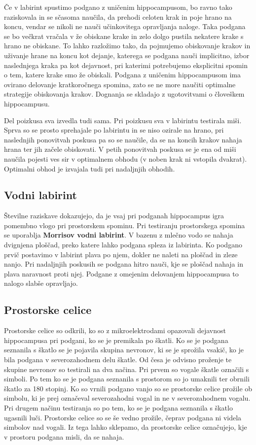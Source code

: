 \documentclass[10pt,a4paper]{article}
\begin{document}
Če v labirint spustimo podgano z uničenim hippocampusom, bo ravno tako raziskovala in se sčasoma naučila, da prehodi celoten krak in poje hrano na koncu, vendar se nikoli ne nauči učinkovitega opravljanja naloge. Taka podgana se bo večkrat vračala v že obiskane krake in zelo dolgo pustila nekatere krake s hrano ne obiskane. To lahko razložimo tako, da pojmujemo obiskovanje krakov in uživanje hrane na koncu kot dejanje, katerega se podgana nauči implicitno, izbor naslednjega kraka pa kot dejavnost, pri katerimi potrebujemo eksplicitni spomin o tem, katere krake smo že obiskali. Podgana z uničenim hippocampusom ima ovirano delovanje kratkoročnega spomina, zato se ne more naučiti optimalne strategije obiskovanja krakov. Dognanja se skladajo z ugotovitvami o človeškem hippocampusu.

Del poizkusa sva izvedla tudi sama. Pri poizkusu sva v labirintu testirala miši. Sprva so se prosto sprehajale po labirintu in se niso ozirale na hrano, pri naslednjih ponovitvah poskusa pa so se naučile, da se na koncih krakov nahaja hrana ter jih začele obiskovati. V petih ponovitvah poskusa se je ena od miši naučila pojesti ves sir v optimalnem obhodu (v noben krak ni vstopila dvakrat). Optimalni obhod je izvajala tudi pri nadaljnjih obhodih.

\subsection{Vodni labirint}
Številne raziskave dokazujejo, da je vsaj pri podganah hippocampus igra pomembno vlogo pri prostorskem spominu. Pri testiranju prostorskega spomina se uporablja \textbf{Morrisov vodni labirint}. V bazenu z mlečno vodo se nahaja dvignjena ploščad, preko katere lahko podgana spleza iz labirinta. Ko podgano prvič postavimo v labirint plava po njem, dokler ne naleti na ploščad in zleze nanjo. Pri nadaljnjih poskusih se podgana hitro nauči, kje se ploščad nahaja in plava naravnost proti njej. Podgane z omejenim delovanjem hippocampusa to nalogo slabše opravljajo.

\subsection{Prostorske celice}
Prostorske celice so odkrili, ko so z mikroelektrodami opazovali dejavnost hippocampusa pri podgani, ko se je premikala po škatli. Ko se je podgana seznanila s škatlo se je pojavila skupina nevronov, ki se je sprožila vsakič, ko je bila podgana v severozahodnem delu škatle. Od česa je odvisno proženje te skupine nevronov so testirali na dva načina. Pri prvem so vogale škatle označili s simboli. Po tem ko se je podgana seznanila s prostorom so jo umaknili ter obrnili škatlo za 180 stopinj. Ko so vrnili podgano vanjo so se prostorske celice prožile ob simbolu, ki je prej označeval severozahodni vogal in ne v severozahodnem vogalu. Pri drugem načinu testiranja so po tem, ko se je podgana seznanila s škatlo ugasnili luči. Prostorske celice so se še vedno prožile, čeprav podgana ni videla simbolov nad vogali. Iz tega lahko sklepamo, da prostorske celice označujejo, kje v prostoru podgana misli, da se nahaja.
\end{document}
